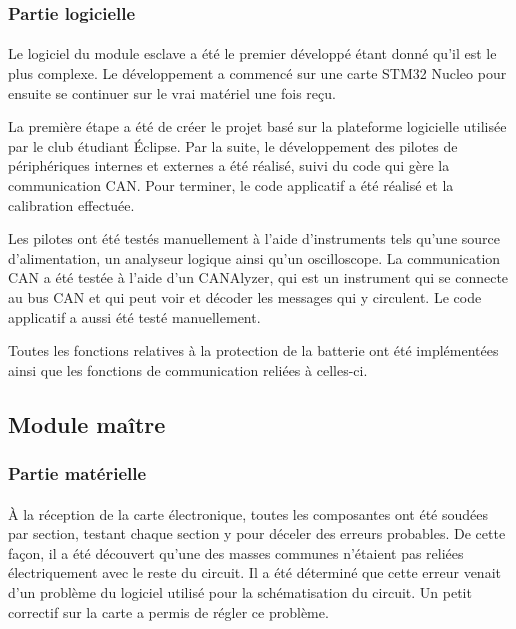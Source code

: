 		\subsubsection{Partie logicielle}

			\paragraph{}
			Le logiciel du module esclave a été le premier développé étant donné qu'il est le plus complexe. Le développement a commencé sur une carte STM32 Nucleo pour ensuite se continuer sur le vrai matériel une fois reçu.

			La première étape a été de créer le projet basé sur la plateforme logicielle utilisée par le club étudiant Éclipse. Par la suite, le développement des pilotes de périphériques internes et externes a été réalisé, suivi du code qui gère la communication CAN. Pour terminer, le code applicatif a été réalisé et la calibration effectuée.

			Les pilotes ont été testés manuellement à l'aide d'instruments tels qu'une source d'alimentation, un analyseur logique ainsi qu'un oscilloscope. La communication CAN a été testée à l'aide d'un CANAlyzer, qui est un instrument qui se connecte au bus CAN et qui peut voir et décoder les messages qui y circulent. Le code applicatif a aussi été testé manuellement.

			Toutes les fonctions relatives à la protection de la batterie ont été implémentées ainsi que les fonctions de communication reliées à celles-ci.



	\subsection{Module maître}

		\subsubsection{Partie matérielle}

			\paragraph{}
			À la réception de la carte électronique, toutes les composantes ont été soudées par section, testant chaque section y pour déceler des erreurs probables. De cette façon, il a été découvert qu’une des masses communes n’étaient pas reliées électriquement avec le reste du circuit. Il a été déterminé que cette erreur venait d’un problème du logiciel utilisé pour la schématisation du circuit. Un petit correctif sur la carte a permis de régler ce problème.

